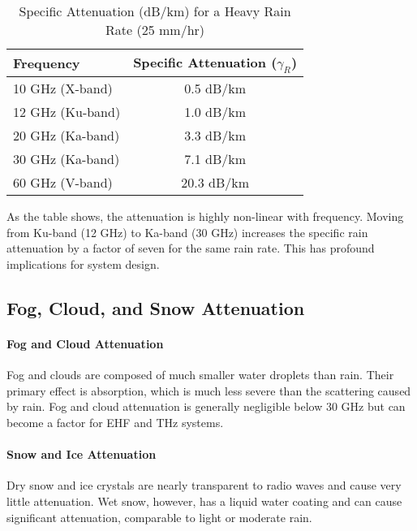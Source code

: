 \begin{table}[H]
    \centering
    \caption{Specific Attenuation (dB/km) for a Heavy Rain Rate (25 mm/hr)}
    \label{tab:rain-attenuation-heavy}
    \begin{tabular}{@{}lc@{}}
        \toprule
        \tableheaderfont Frequency & \tableheaderfont Specific Attenuation ($\gamma_R$) \\
        \midrule
        10 GHz (X-band) & 0.5 dB/km \\
        12 GHz (Ku-band) & 1.0 dB/km \\
        20 GHz (Ka-band) & 3.3 dB/km \\
        30 GHz (Ka-band) & 7.1 dB/km \\
        60 GHz (V-band) & 20.3 dB/km \\
        \bottomrule
    \end{tabular}
\end{table}

\begin{warningbox}
    As the table shows, the attenuation is highly non-linear with frequency. Moving from Ku-band (12 GHz) to Ka-band (30 GHz) increases the specific rain attenuation by a factor of seven for the same rain rate. This has profound implications for system design.
\end{warningbox}


\subsection{Fog, Cloud, and Snow Attenuation}

\paragraph{Fog and Cloud Attenuation}
Fog and clouds are composed of much smaller water droplets than rain. Their primary effect is absorption, which is much less severe than the scattering caused by rain. Fog and cloud attenuation is generally negligible below 30 GHz but can become a factor for EHF and THz systems.

\paragraph{Snow and Ice Attenuation}
Dry snow and ice crystals are nearly transparent to radio waves and cause very little attenuation. Wet snow, however, has a liquid water coating and can cause significant attenuation, comparable to light or moderate rain.


